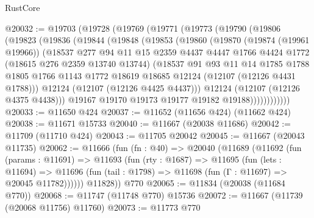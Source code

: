 \begin{lexlean}{RustCore}
\begin{coremodule}
@20032 := @19703
    (@19728
      (@19769
        (@19771
          (@19773
            (@19790
              (@19806
                (@19823
                  (@19836
                    (@19844
                      (@19848
                        (@19853
                          (@19860
                            (@19870
                              (@19874 (@19961 @19966))
                              (@18537
                                @277
                                @94
                                @11
                                @15
                                @2359
                                @4437
                                @4447
                                @1766
                                @4424
                                @1772
                                (@18615 @276 @2359 @13740 @13744)
                                (@18537
                                  @91
                                  @93
                                  @11
                                  @14
                                  @1785
                                  @1788
                                  @1805
                                  @1766
                                  @1143
                                  @1772
                                  @18619
                                  @18685
                                  @12124
                                  (@12107 (@12126 @4431 @1788)))
                                @12124
                                (@12107 (@12126 @4425 @4437)))
                              @12124
                              (@12107 (@12126 @4375 @4438)))
                            @19167
                            @19170
                            @19173
                            @19177
                            @19182
                            @19188))))))))))))
@20033 := @11650 @424
@20037 := @11652 (@11656 @424) (@11662 @424)
@20038 := @11671 @15733
@20040 := @11667 (@20038 @11686)
@20042 := @11709 (@11710 @424)
@20043 := @11705 @20042
@20045 := @11667 (@20043 @11735)
@20062 := @11666
    (fun (fn : @40) =>
    @20040
      (@11689
        (@11692
          (fun (params : @11691) =>
          @11693
            (fun (rty : @1687) =>
            @11695
              (fun (lets : @11694) =>
              @11696 (fun (tail : @1798) => @11698 (fun (Γ : @11697) => @20045 @11782))))))
        @11828))
    @770
@20065 := @11834 (@20038 (@11684 @770))
@20068 := @11747 (@11748 @770) @15736
@20072 := @11667 (@11739 (@20068 @11756) @11760)
@20073 := @11773 @770

\end{coremodule}
\end{lexlean}
